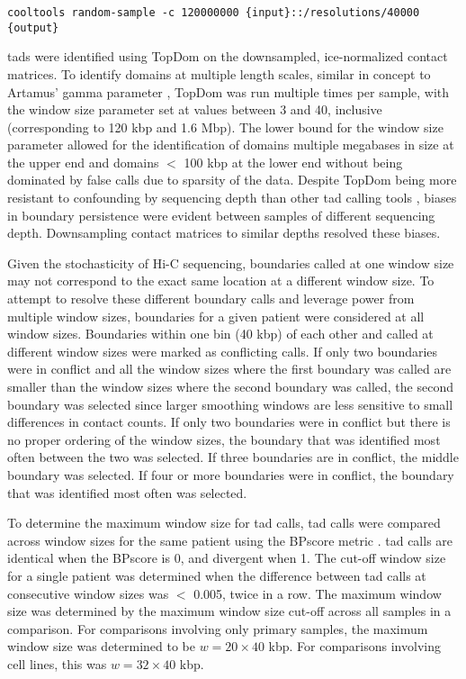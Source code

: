 \begin{lstlisting}[basicstyle=\ttfamily]
cooltools random-sample -c 120000000 {input}::/resolutions/40000 {output}
\end{lstlisting}

\glspl{tad} were identified using TopDom \cite{shinTopDomEfficientDeterministic2016} on the downsampled, \gls{ice}-normalized contact matrices.
To identify domains at multiple length scales, similar in concept to Artamus' gamma parameter \cite{filippovaIdentificationAlternativeTopological2014}, TopDom was run multiple times per sample, with the window size parameter set at values between 3 and 40, inclusive (corresponding to 120 kbp and 1.6 Mbp).
The lower bound for the window size parameter allowed for the identification of domains multiple megabases in size at the upper end and domains $<$ 100 kbp at the lower end without being dominated by false calls due to sparsity of the data.
Despite TopDom being more resistant to confounding by sequencing depth than other \gls{tad} calling tools \cite{forcatoComparisonComputationalMethods2017}, biases in boundary persistence were evident between samples of different sequencing depth.
Downsampling contact matrices to similar depths resolved these biases.

Given the stochasticity of Hi-C sequencing, boundaries called at one window size may not correspond to the exact same location at a different window size.
To attempt to resolve these different boundary calls and leverage power from multiple window sizes, boundaries for a given patient were considered at all window sizes.
Boundaries within one bin (40 kbp) of each other and called at different window sizes were marked as conflicting calls.
If only two boundaries were in conflict and all the window sizes where the first boundary was called are smaller than the window sizes where the second boundary was called, the second boundary was selected since larger smoothing windows are less sensitive to small differences in contact counts.
If only two boundaries were in conflict but there is no proper ordering of the window sizes, the boundary that was identified most often between the two was selected.
If three boundaries are in conflict, the middle boundary was selected.
If four or more boundaries were in conflict, the boundary that was identified most often was selected.

To determine the maximum window size for \gls{tad} calls, \gls{tad} calls were compared across window sizes for the same patient using the BPscore metric \cite{zaborowskiBPscoreEffectiveMetric2019}.
\gls{tad} calls are identical when the BPscore is 0, and divergent when 1.
The cut-off window size for a single patient was determined when the difference between \gls{tad} calls at consecutive window sizes was $<$ 0.005, twice in a row.
The maximum window size was determined by the maximum window size cut-off across all samples in a comparison.
For comparisons involving only primary samples, the maximum window size was determined to be $w = 20 \times 40$ kbp.
For comparisons involving cell lines, this was $w = 32 \times 40$ kbp.

